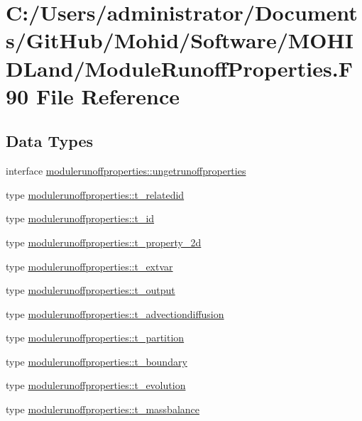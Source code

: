 \hypertarget{_module_runoff_properties_8_f90}{}\section{C\+:/\+Users/administrator/\+Documents/\+Git\+Hub/\+Mohid/\+Software/\+M\+O\+H\+I\+D\+Land/\+Module\+Runoff\+Properties.F90 File Reference}
\label{_module_runoff_properties_8_f90}
\subsection*{Data Types}
\begin{DoxyCompactItemize}
\item 
interface \mbox{\hyperlink{interfacemodulerunoffproperties_1_1ungetrunoffproperties}{modulerunoffproperties\+::ungetrunoffproperties}}
\item 
type \mbox{\hyperlink{structmodulerunoffproperties_1_1t__relatedid}{modulerunoffproperties\+::t\+\_\+relatedid}}
\item 
type \mbox{\hyperlink{structmodulerunoffproperties_1_1t__id}{modulerunoffproperties\+::t\+\_\+id}}
\item 
type \mbox{\hyperlink{structmodulerunoffproperties_1_1t__property__2d}{modulerunoffproperties\+::t\+\_\+property\+\_\+2d}}
\item 
type \mbox{\hyperlink{structmodulerunoffproperties_1_1t__extvar}{modulerunoffproperties\+::t\+\_\+extvar}}
\item 
type \mbox{\hyperlink{structmodulerunoffproperties_1_1t__output}{modulerunoffproperties\+::t\+\_\+output}}
\item 
type \mbox{\hyperlink{structmodulerunoffproperties_1_1t__advectiondiffusion}{modulerunoffproperties\+::t\+\_\+advectiondiffusion}}
\item 
type \mbox{\hyperlink{structmodulerunoffproperties_1_1t__partition}{modulerunoffproperties\+::t\+\_\+partition}}
\item 
type \mbox{\hyperlink{structmodulerunoffproperties_1_1t__boundary}{modulerunoffproperties\+::t\+\_\+boundary}}
\item 
type \mbox{\hyperlink{structmodulerunoffproperties_1_1t__evolution}{modulerunoffproperties\+::t\+\_\+evolution}}
\item 
type \mbox{\hyperlink{structmodulerunoffproperties_1_1t__massbalance}{modulerunoffproperties\+::t\+\_\+massbalance}}

\end{DoxyCompactItemize}
